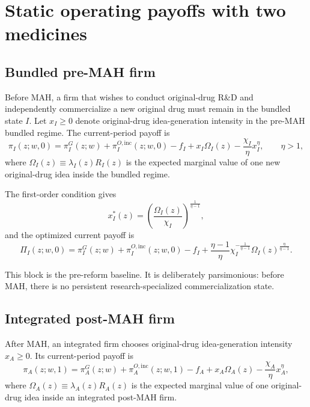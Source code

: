 \documentclass[12pt]{article}
\newcommand{\1}{\mathbf{1}}
\begin{document}
\section{Static operating payoffs with two medicines}

\subsection{Bundled pre-MAH firm}

Before MAH, a firm that wishes to conduct original-drug R\&D and independently commercialize a new original drug must remain in the bundled state $I$. Let $x_I\ge 0$ denote original-drug idea-generation intensity in the pre-MAH bundled regime. The current-period payoff is
\begin{equation}
\pi_I(z;w,0)
=
\pi_I^G(z;w)
+\pi_I^{O,\mathrm{inc}}(z;w,0)
-f_I
+x_I\Omega_I(z)-\frac{\chi_I}{\eta}x_I^{\eta},
\qquad \eta>1,
\label{eq:piI}
\end{equation}
where $\Omega_I(z)\equiv \lambda_I(z)R_I(z)$ is the expected marginal value of one new original-drug idea inside the bundled regime.

The first-order condition gives
\begin{equation}
x_I^*(z)=\left(\frac{\Omega_I(z)}{\chi_I}\right)^{\frac{1}{\eta-1}},
\label{eq:xI}
\end{equation}
and the optimized current payoff is
\begin{equation}
\Pi_I(z;w,0)
=
\pi_I^G(z;w)
+\pi_I^{O,\mathrm{inc}}(z;w,0)
-f_I
+\frac{\eta-1}{\eta}\chi_I^{-\frac{1}{\eta-1}}\Omega_I(z)^{\frac{\eta}{\eta-1}}.
\label{eq:PiI}
\end{equation}

This block is the pre-reform baseline. It is deliberately parsimonious: before MAH, there is no persistent research-specialized commercialization state.

\subsection{Integrated post-MAH firm}

After MAH, an integrated firm chooses original-drug idea-generation intensity $x_A\ge 0$. Its current-period payoff is
\begin{equation}
\pi_A(z;w,1)
=
\pi_A^G(z;w)
+\pi_A^{O,\mathrm{inc}}(z;w,1)
-f_A
+x_A\Omega_A(z)-\frac{\chi_A}{\eta}x_A^{\eta},
\label{eq:piA}
\end{equation}
where $\Omega_A(z)\equiv \lambda_A(z)R_A(z)$ is the expected marginal value of one original-drug idea inside an integrated post-MAH firm.
\end{document}
